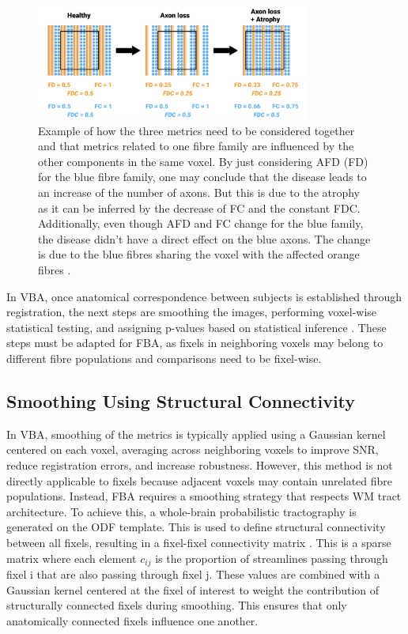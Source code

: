 \begin{figure}[h]
  \centering
  \includegraphics[width=0.8\textwidth]{Images/atrophy.png} %
  \caption{Example of how the three metrics need to be considered together and that metrics related to one fibre family are influenced by the other components in the same voxel. By just considering AFD (FD) for the blue fibre family, one may conclude that the disease leads to an increase of the number of axons. But this is due to the atrophy as it can be inferred by the decrease of FC and the constant FDC. Additionally, even though AFD and FC change for the blue family, the disease didn't have a direct effect on the blue axons. The change is due to the blue fibres sharing the voxel with the affected orange fibres \cite{Dhollander2021}.}
  \label{fig:atrophy}
\end{figure}

In VBA, once anatomical correspondence between subjects is established through registration, the next steps are smoothing the images, performing voxel-wise statistical testing, and assigning p-values based on statistical inference \cite{Raffelt2015}. These steps must be adapted for FBA, as fixels in neighboring voxels may belong to different fibre populations and comparisons need to be fixel-wise.

\subsection{Smoothing Using Structural Connectivity}
In VBA, smoothing of the metrics is typically applied using a Gaussian kernel centered on each voxel, averaging across neighboring voxels to improve SNR, reduce registration errors, and increase robustness. However, this method is not directly applicable to fixels because adjacent voxels may contain unrelated fibre populations. Instead, FBA requires a smoothing strategy that respects WM tract architecture. To achieve this, a whole-brain probabilistic tractography is generated on the ODF template. This is used to define structural connectivity between all fixels, resulting in a fixel-fixel connectivity matrix \cite{Raffelt2015}. This is a sparse matrix where each element $c_{ij}$ is the proportion of streamlines passing through fixel i that are also passing through fixel j. These values are combined with a Gaussian kernel centered at the fixel of interest to weight the contribution of structurally connected fixels during smoothing. This ensures that only anatomically connected fixels influence one another.

